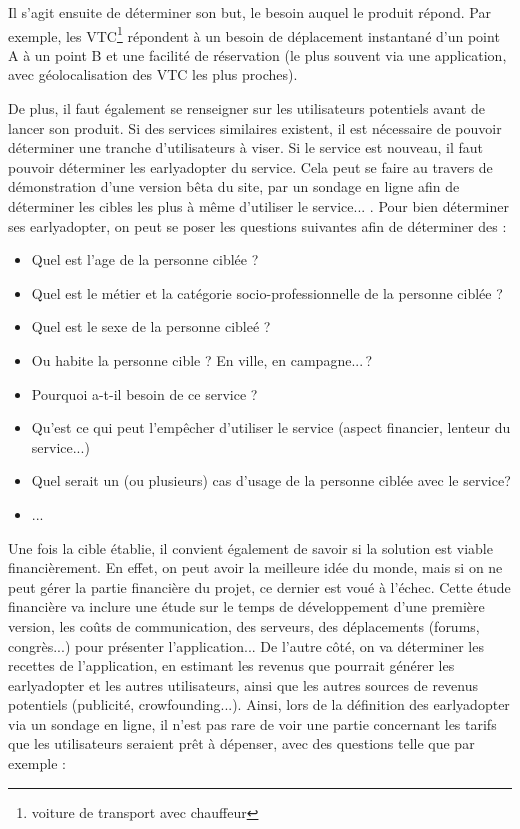 Il s'agit ensuite de déterminer son but, le besoin auquel le produit répond. Par exemple, les VTC\footnote{voiture de transport avec chauffeur} répondent à un besoin de déplacement instantané d'un point A à un point B et une facilité de réservation (le plus souvent via une application, avec géolocalisation des VTC les plus proches).  

De plus, il faut également se renseigner sur les utilisateurs potentiels avant de lancer son produit. Si des services similaires existent, il est nécessaire de pouvoir déterminer une tranche d'utilisateurs à viser. Si le service est nouveau, il faut pouvoir déterminer les \gls{earlyadopter} du service. Cela peut se faire au travers de démonstration d'une version bêta du site, par un sondage en ligne afin de déterminer les cibles les plus à même d'utiliser le service... . Pour bien déterminer ses \gls{earlyadopter}, on peut se poser les questions suivantes afin de déterminer des  : 

\begin{itemize}
	\item Quel est l'age de la personne ciblée ?
	\item Quel est le métier et la catégorie socio-professionnelle de la personne ciblée ?
	\item Quel est le sexe de la personne cibleé ? 
	\item Ou habite la personne cible ? En ville, en campagne... ? 
	\item Pourquoi a-t-il besoin de ce service ? 
	\item Qu'est ce qui peut l'empêcher d'utiliser le service (aspect financier, lenteur du service...) 
	\item Quel serait un (ou plusieurs) cas d'usage de la personne ciblée avec le service?
	\item ...
\end{itemize}

Une fois la cible établie, il convient également de savoir si la solution est viable financièrement. En effet, on peut avoir la meilleure idée du monde, mais si on ne peut gérer la partie financière du projet, ce dernier est voué à l'échec. Cette étude financière va inclure une étude sur le temps de développement d'une première version, les coûts de communication, des serveurs, des déplacements (forums, congrès...) pour présenter l'application... De l'autre côté, on va déterminer les recettes de l'application, en estimant les revenus que pourrait générer les \gls{earlyadopter} et les autres utilisateurs, ainsi que les autres sources de revenus potentiels (publicité, crowfounding...). Ainsi, lors de la définition des \gls{earlyadopter} via un sondage en ligne, il n'est pas rare de voir une partie concernant les tarifs que les utilisateurs seraient prêt à dépenser, avec des questions telle que par exemple : 


